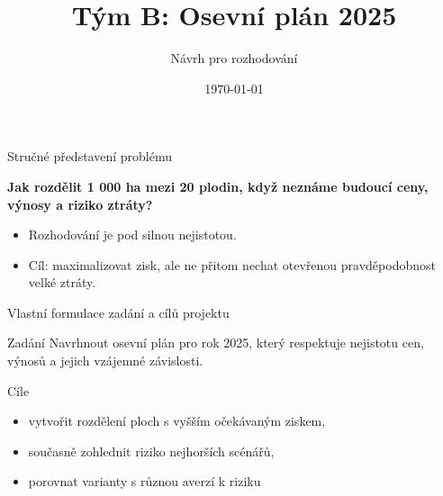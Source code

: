 ﻿\documentclass[11pt]{beamer}
\title{Tým B: Osevní plán 2025}
\author{Návrh pro rozhodování}
\date{\today}
\begin{document}
\begin{frame}
  \titlepage
\end{frame}

\begin{frame}{Stručné představení problému}
  \vspace{0.3cm}
  \begin{center}
    \textbf{Jak rozdělit 1 000 ha mezi 20 plodin, když neznáme budoucí ceny, výnosy a riziko ztráty?}
  \end{center}
  \vspace{0.5cm}
  \begin{center}
  \end{center}
  \vspace{0.4cm}
  \begin{itemize}
    \item Rozhodování je pod silnou nejistotou.
    \item Cíl: maximalizovat zisk, ale ne přitom nechat otevřenou pravděpodobnost velké ztráty.
  \end{itemize}
\end{frame}

\begin{frame}{Vlastní formulace zadání a cílů projektu}
  \begin{block}{Zadání}
    Navrhnout osevní plán pro rok 2025, který respektuje nejistotu cen, výnosů a jejich vzájemné závislosti.
  \end{block}
  \vspace{0.3cm}
  \begin{block}{Cíle}
    \begin{itemize}
      \item vytvořit rozdělení ploch s vyšším očekávaným ziskem,
      \item současně zohlednit riziko nejhorších scénářů,
      \item porovnat varianty s různou averzí k riziku
    \end{itemize}
  \end{block}
\end{frame}
\end{document}
